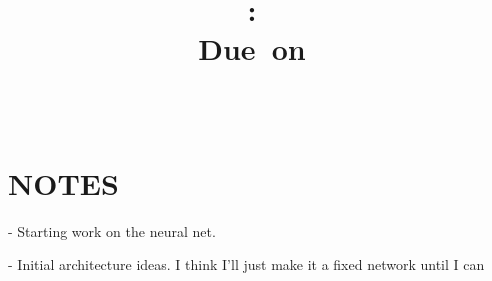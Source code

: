\documentclass{article}
\title{\vspace{2in}\textmd{\textbf{\hmwkClass:\ \hmwkTitle\ifthenelse{\equal{\hmwkSubTitle}{}}{}{\\\hmwkSubTitle}}}\\\normalsize\vspace{0.1in}\small{Due\ on\ \hmwkDueDate}\\\vspace{0.1in}\large{\textit{\hmwkClassInstructor\ \hmwkClassTime}}\vspace{3in}}
\date{}
\author{\textbf{\hmwkAuthorName}}
\begin{document}
\maketitle

\section{NOTES}
- Starting work on the neural net.

- Initial architecture ideas.  I think I'll just make it a fixed
network until I can
\end{document}
